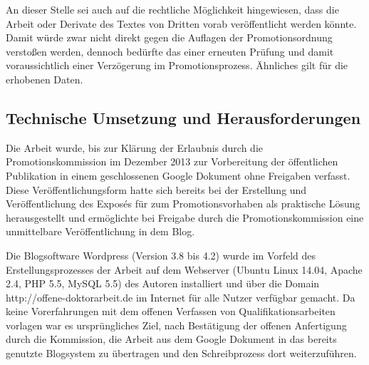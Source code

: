 An dieser Stelle sei auch auf die rechtliche Möglichkeit hingewiesen, dass die Arbeit oder Derivate des Textes von Dritten vorab veröffentlicht werden könnte. Damit würde zwar nicht direkt gegen die Auflagen der Promotionsordnung verstoßen werden, dennoch bedürfte das einer erneuten Prüfung und damit voraussichtlich einer Verzögerung im Promotionsprozess. Ähnliches gilt für die erhobenen Daten.

\subsection{Technische Umsetzung und Herausforderungen}

Die Arbeit wurde, bis zur Klärung der Erlaubnis durch die Promotionskommission im Dezember 2013 zur Vorbereitung der öffentlichen Publikation in einem geschlossenen Google Dokument ohne Freigaben verfasst. Diese Veröffentlichungsform hatte sich bereits bei der Erstellung und Veröffentlichung des Exposés für zum Promotionsvorhaben \cite{heise_2012_expose} als praktische Lösung herausgestellt und ermöglichte bei Freigabe durch die Promotionskommission eine unmittelbare Veröffentlichung in dem Blog.

Die Blogsoftware Wordpress (Version 3.8 bis 4.2) wurde im Vorfeld des Erstellungsprozesses der Arbeit auf dem Webserver (Ubuntu Linux 14.04, Apache 2.4, PHP 5.5, MySQL 5.5) des Autoren installiert und über die Domain http://offene-doktorarbeit.de im Internet für alle Nutzer verfügbar gemacht. Da keine Vorerfahrungen mit dem offenen Verfassen von Qualifikationsarbeiten vorlagen war es ursprüngliches Ziel, nach Bestätigung der offenen Anfertigung durch die Kommission, die Arbeit aus dem Google Dokument in das bereits genutzte Blogsystem zu übertragen und den Schreibprozess dort weiterzuführen.

